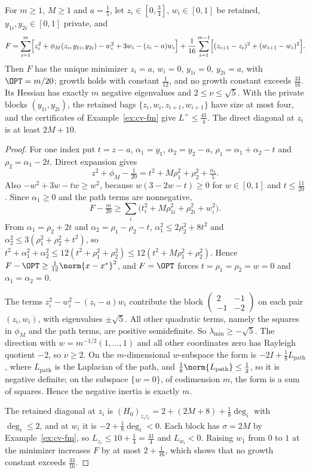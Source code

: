 \begin{proposition}\label{prop:cv-ladder}
For $m\ge1$, $M\ge1$ and $a=\frac15$, let $z_i\in[0,\frac34]$,
$w_i\in[0,1]$ be retained, $y_{1i},y_{2i}\in[0,1]$ private, and
\[
F=\sum_{i=1}^m\Bigl[z_i^2+\phi_M(z_i,y_{1i},y_{2i})-w_i^2+3w_i-(z_i-a)w_i\Bigr]
+\frac1{16}\sum_{i=1}^{m-1}\Bigl[(z_{i+1}-z_i)^2+(w_{i+1}-w_i)^2\Bigr].
\]
Then $F$ has the unique minimizer $z_i=a$, $w_i=0$, $y_{1i}=0$,
$y_{2i}=a$, with $\OPT=m/20$; growth holds with constant $\frac1{12}$, and
no growth constant exceeds $\frac{33}{16}$. Its Hessian has exactly $m$
negative eigenvalues and $2\le\nu\le\sqrt5$. With the private blocks
$(y_{1i},y_{2i})$, the retained bags $\{z_i,w_i,z_{i+1},w_{i+1}\}$ have size
at most four, and the certificates of Example~\ref{ex:cv-fm} give
$L^+\le\frac{41}4$. The direct diagonal at $z_i$ is at least $2M+10$.
\end{proposition}

\begin{proof}
For one index put $t=z-a$, $\alpha_1=y_1$, $\alpha_2=y_2-a$,
$\rho_1=\alpha_1+\alpha_2-t$ and $\rho_2=\alpha_1-2t$. Direct expansion
gives
\[
z^2+\phi_M-\tfrac1{20}=t^2+M\rho_1^2+\rho_2^2+\tfrac{\alpha_1}5.
\]
Also $-w^2+3w-tw\ge w^2$, because $w(3-2w-t)\ge0$ for $w\in[0,1]$ and
$t\le\frac{11}{20}$. Since $\alpha_1\ge0$ and the path terms are
nonnegative,
\[
F-\tfrac m{20}\ge\sum_i\bigl(t_i^2+M\rho_{1i}^2+\rho_{2i}^2+w_i^2\bigr).
\]
From $\alpha_1=\rho_2+2t$ and $\alpha_2=\rho_1-\rho_2-t$,
$\alpha_1^2\le2\rho_2^2+8t^2$ and $\alpha_2^2\le3(\rho_1^2+\rho_2^2+t^2)$, so
$t^2+\alpha_1^2+\alpha_2^2\le12(t^2+\rho_1^2+\rho_2^2)\le12(t^2+M\rho_1^2+\rho_2^2)$.
Hence $F-\OPT\ge\frac1{12}\norm{x-x^*}^2$, and $F=\OPT$ forces
$t=\rho_1=\rho_2=w=0$ and $\alpha_1=\alpha_2=0$.

The terms $z_i^2-w_i^2-(z_i-a)w_i$ contribute the block
$\left(\begin{smallmatrix}2&-1\\-1&-2\end{smallmatrix}\right)$ on each pair
$(z_i,w_i)$, with eigenvalues $\pm\sqrt5$. All other quadratic terms, namely
the squares in $\phi_M$ and the path terms, are positive semidefinite. So
$\lambda_{\min}\ge-\sqrt5$. The direction with $w=m^{-1/2}(1,\ldots,1)$ and
all other coordinates zero has Rayleigh quotient $-2$, so $\nu\ge2$. On the
$m$-dimensional $w$-subspace the form is $-2I+\frac18L_{\mathrm{path}}$, where
$L_{\mathrm{path}}$ is the Laplacian of the path, and
$\frac18\norm{L_{\mathrm{path}}}\le\frac12$, so it is negative definite; on
the subspace $\{w=0\}$, of codimension $m$, the form is a sum of squares.
Hence the negative inertia is exactly $m$.

The retained diagonal at $z_i$ is
$(H_0)_{z_iz_i}=2+(2M+8)+\frac18\deg_i$ with $\deg_i\le2$, and at $w_i$ it
is $-2+\frac18\deg_i<0$. Each block has $\sigma=2M$ by
Example~\ref{ex:cv-fm}, so $L_{z_i}\le10+\frac14=\frac{41}4$ and
$L_{w_i}<0$. Raising $w_1$ from $0$ to $1$ at the minimizer increases $F$ by
at most $2+\frac1{16}$, which shows that no growth constant exceeds
$\frac{33}{16}$.
\end{proof}

